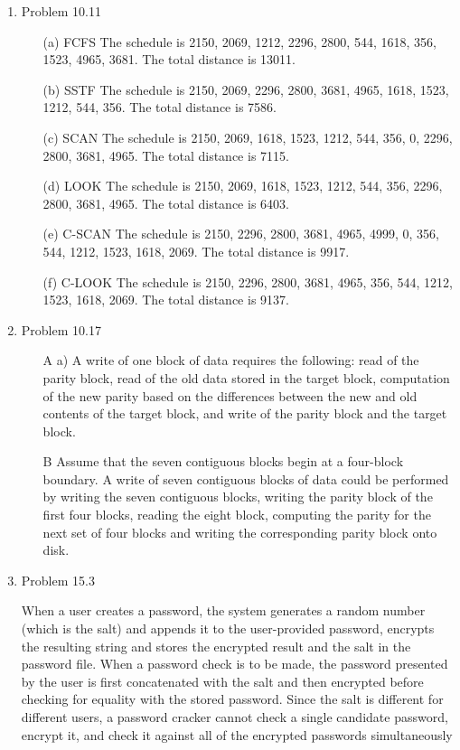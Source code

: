 \documentclass[a4paper,11pt]{article}
\theoremstyle{mytheor}
\begin{document}
\begin{enumerate}
\item{Problem 10.11}
    \begin{enumerate}
        \item[(a)]FCFS {\color{black}The schedule is 2150, 2069, 1212, 2296, 2800, 544, 1618, 356, 1523, 4965, 3681. The total distance is 13011.}
        \item[(b)]SSTF {\color{black}The schedule is 2150, 2069, 2296, 2800, 3681, 4965, 1618, 1523, 1212, 544, 356. The total distance is 7586.}
        \item[(c)]SCAN {\color{black}The schedule is 2150, 2069, 1618, 1523, 1212, 544, 356, 0, 2296, 2800, 3681, 4965. The total distance is 7115.}
        \item[(d)]LOOK {\color{black}The schedule is 2150, 2069, 1618, 1523, 1212, 544, 356, 2296, 2800, 3681, 4965. The total distance is 6403.}
        \item[(e)]C-SCAN {\color{black}The schedule is 2150, 2296, 2800, 3681, 4965, 4999, 0, 356, 544, 1212, 1523, 1618, 2069. The total distance is 9917.}
        \item[(f)]C-LOOK {\color{black}The schedule is 2150, 2296, 2800, 3681, 4965, 356, 544, 1212, 1523, 1618, 2069. The total distance is 9137.}
\end{enumerate}


\pagebreak

\item{Problem 10.17}
    \begin{enumerate}
    \item[A] a) A write of one block of data requires the following: read
of the parity block, read of the old data stored in the target block,
computation of the new parity based on the differences between the
new and old contents of the target block, and write of the parity block
and the target block. 
    \item[B]
    Assume that the seven contiguous blocks begin
at a four-block boundary. A write of seven contiguous blocks of data
could be performed by writing the seven contiguous blocks, writing the
parity block of the first four blocks, reading the eight block, computing
the parity for the next set of four blocks and writing the corresponding
parity block onto disk.
    \end{enumerate}
    
\item{Problem 15.3} \par
    When a user creates a password, the system generates a
random number (which is the salt) and appends it to the user-provided
password, encrypts the resulting string and stores the encrypted result
and the salt in the password file. When a password check is to be
made, the password presented by the user is first concatenated with
the salt and then encrypted before checking for equality with the stored
password. Since the salt is different for different users, a password
cracker cannot check a single candidate password, encrypt it, and check
it against all of the encrypted passwords simultaneously


\end{enumerate}
\end{document}
